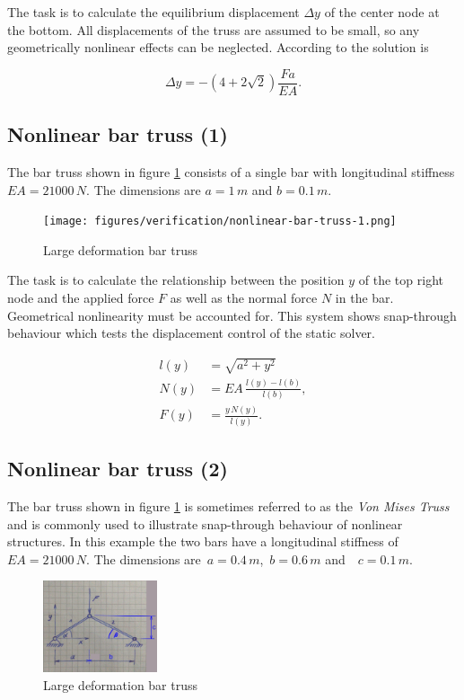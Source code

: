 The task is to calculate the equilibrium displacement $\Delta y$ of the center node at the bottom.
All displacements of the truss are assumed to be small, so any geometrically nonlinear effects can be neglected.
According to \cite{bib:tm2} the solution is

$$
\Delta y = -\left(4 + 2\sqrt{2}\right)\frac{Fa}{EA}.
$$

\subsection*{Nonlinear bar truss (1)}

The bar truss shown in figure \ref{fig:verification:nonlinear-bar-truss-1} consists of a single bar with longitudinal stiffness $EA = 21000\,\unit{N}$.
The dimensions are $a = 1\,\unit{m}$ and $b = 0.1\,\unit{m}$.

\begin{figure}[H]
\centering
\texttt{[image: figures/verification/nonlinear-bar-truss-1.png]}
\caption{Large deformation bar truss}
\label{fig:verification:nonlinear-bar-truss-1}
\end{figure}

The task is to calculate the relationship between the position $y$ of the top right node and the applied force $F$ as well as the normal force $N$ in the bar.
Geometrical nonlinearity must be accounted for.
This system shows snap-through behaviour which tests the displacement control of the static solver.

\begin{align*}
l(y) &= \sqrt{a^2 + y^2} \\
N(y) &= EA\,\frac{l(y) - l(b)}{l(b)}, \\
F(y) &= \frac{y\,N(y)}{l(y)}.
\end{align*}

\newpage
\subsection*{Nonlinear bar truss (2)}

The bar truss shown in figure \ref{fig:verification:nonlinear-bar-truss-1} is sometimes referred to as the \textit{Von Mises Truss} and is commonly used to illustrate snap-through behaviour of nonlinear structures.
In this example the two bars have a longitudinal stiffness of~$EA = 21000\,\unit{N}$.
The dimensions are~$a = 0.4\,\unit{m}$,~$b = 0.6\,\unit{m}$ and~~$c = 0.1\,\unit{m}$.

\begin{figure}[H]
\centering
\includegraphics[width=0.3\textwidth]{figures/verification/nonlinear-bar-truss-2.png}
\caption{Large deformation bar truss}
\label{fig:verification:nonlinear-bar-truss-2}
\end{figure}

